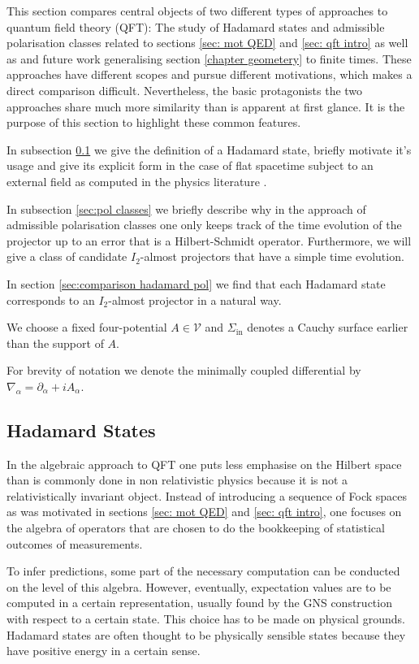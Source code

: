 \documentclass[b5paper,draft,openbib,12pt]{memoir}
\begin{document}
This section compares central objects of two different 
types of approaches to quantum field theory (QFT): 
The study of Hadamard states and admissible polarisation classes 
related to sections \ref{sec: mot QED} and \ref{sec: qft intro}
as well as \cite{ivp0,ivp1,ivp2} and future work 
generalising section \ref{chapter geometery} to finite times.
These approaches have different scopes and pursue different 
motivations, which makes a direct comparison difficult.
Nevertheless, the basic protagonists the two approaches 
share much more similarity than is apparent at first glance.
It is the purpose of this section to highlight these common features. 

In subsection \ref{sec:hadamard} we give the definition of a Hadamard 
state, briefly motivate it's usage 
and give its explicit form in the case of flat spacetime subject 
to an external field as computed in the physics literature 
\cite{schlemmer2015current}.

In subsection \ref{sec:pol classes} we briefly describe why 
in the approach of admissible polarisation classes one only keeps 
track of the time
evolution of the projector up to an error that is a 
Hilbert-Schmidt operator. Furthermore, we will give a class 
of candidate \(I_2\)-almost projectors
that have a simple time evolution.

In section \ref{sec:comparison hadamard pol} we find that each 
Hadamard state corresponds to an \(I_2\)-almost projector in a 
natural way.

We choose 
a fixed four-potential \(A\in \mathcal{V}\) 
and \(\Sigma_{\text{in}}\) denotes a 
Cauchy surface earlier than the support of \(A\).


For brevity of notation we denote the minimally coupled 
differential by \(\nabla_{\alpha} = \partial_{\alpha} + 
i A_{\alpha}\).


\subsection{Hadamard States}\label{sec:hadamard}
In the algebraic approach to QFT one puts less emphasise on the 
Hilbert space than is commonly done in non relativistic physics 
because 
it is not a relativistically invariant object.
Instead of introducing a sequence of Fock spaces as was motivated 
in sections \ref{sec: mot QED} and 
\ref{sec: qft intro}, one focuses on the algebra of operators that 
are chosen to do the bookkeeping of statistical 
outcomes of measurements. 

To infer predictions, some part of the necessary computation 
can be conducted on the level of this algebra. However,
eventually, expectation values are to be computed in a certain 
representation, usually found by the GNS construction
with respect to a certain state.
This choice has to be made on physical grounds. 
Hadamard states are often thought to be physically sensible 
states because they have positive energy in a certain sense.
\end{document}
